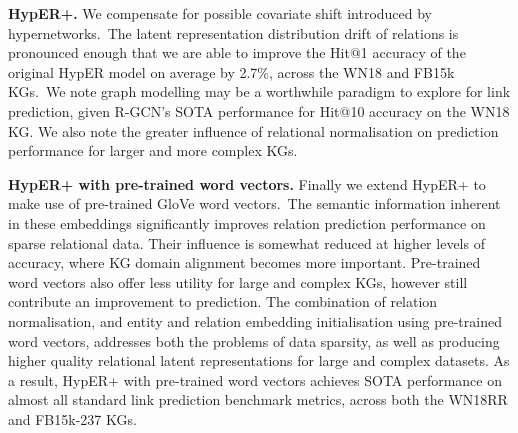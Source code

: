 \noindent \textbf{HypER+.} We compensate for possible covariate shift introduced by hypernetworks.\ The latent representation distribution drift of relations is pronounced enough that we are able to improve the Hit@1 accuracy of the original HypER model on average by 2.7\%, across the WN18 and FB15k KGs.\ We note graph modelling may be a worthwhile paradigm to explore for link prediction, given R-GCN's SOTA performance for Hit@10 accuracy on the WN18 KG. We also note the greater influence of relational normalisation on prediction performance for larger and more complex KGs. \par

\noindent \textbf{HypER+ with pre-trained word vectors.} Finally we extend HypER+ to make use of pre-trained GloVe word vectors.\ The semantic information inherent in these embeddings significantly improves relation prediction performance on sparse relational data. Their influence is somewhat reduced at higher levels of accuracy, where KG domain alignment becomes more important. Pre-trained word vectors also offer less utility for large and complex KGs, however still contribute an improvement to prediction. The combination of relation normalisation, and entity and relation embedding initialisation using pre-trained word vectors, addresses both the problems of data sparsity, as well as producing higher quality relational latent representations for large and complex datasets. As a result, HypER+ with pre-trained word vectors achieves SOTA performance on almost all standard link prediction benchmark metrics, across both the WN18RR and FB15k-237 KGs. 
